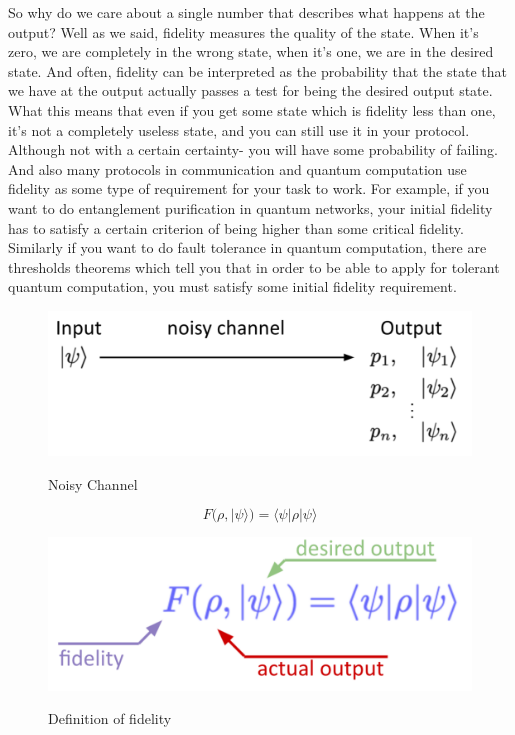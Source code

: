 So why do we care about a single number that describes what happens at the output? Well as we said, fidelity measures the quality of the state. When it's zero, we are completely in the wrong state, when it's one, we are in the desired state. And often, fidelity can be interpreted as the probability that the state that we have at the output actually passes a test for being the desired output state. What this means that even if you get some state which is fidelity less than one, it's not a completely useless state, and you can still use it in your protocol. Although not with a certain certainty- you will have some probability of failing. And also many protocols in communication and quantum computation use fidelity as some type of requirement for your task to work. For example, if you want to do entanglement purification in quantum networks, your initial fidelity has to satisfy a certain criterion of being higher than some critical fidelity. Similarly if you want to do fault tolerance in quantum computation, there are thresholds theorems which tell you that in order to be able to apply for tolerant quantum computation, you must satisfy some initial fidelity requirement.

\begin{figure}[H]
    \centering
    \includegraphics[width=1.0\textwidth]{lesson3/noisy_channel_buildup.pdf}
    \label{fig: 1}
    \begin{center}
        \caption{Noisy Channel}
    \end{center}
\end{figure}

\begin{equation}
F(\rho,|\psi\rangle)=\langle\psi|\rho| \psi\rangle
\end{equation}

\begin{figure}[H]
    \centering
    \includegraphics[width=1.0\textwidth]{lesson3/Annotated_Fidelity_defn.pdf}
    \label{fig: 1}
    \begin{center}
        \caption{Definition of fidelity}
    \end{center}
\end{figure}

